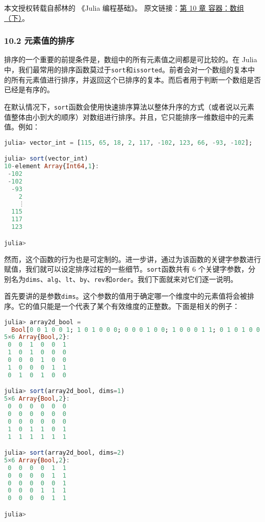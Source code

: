 
本文授权转载自郝林的 《Julia 编程基础》。 原文链接：\href{https://github.com/hyper0x/JuliaBasics/blob/master/book/ch10.md}{第 10 章 容器：数组（下）}。


\subsubsection{10.2 元素值的排序}

排序的一个重要的前提条件是，数组中的所有元素值之间都是可比较的。在 Julia 中，我们最常用的排序函数莫过于\verb`sort`和\verb`issorted`。前者会对一个数组的复本中的所有元素值进行排序，并返回这个已排序的复本。而后者用于判断一个数组是否已经是有序的。

在默认情况下，\verb`sort`函数会使用快速排序算法以整体升序的方式（或者说以元素值整体由小到大的顺序）对数组进行排序。并且，它只能排序一维数组中的元素值。例如：

\begin{lstlisting}[language=julia]
julia> vector_int = [115, 65, 18, 2, 117, -102, 123, 66, -93, -102];

julia> sort(vector_int)
10-element Array{Int64,1}:
 -102
 -102
  -93
    2
    ⋮
  115
  117
  123

julia>
\end{lstlisting}

然而，这个函数的行为也是可定制的。进一步讲，通过为该函数的关键字参数进行赋值，我们就可以设定排序过程的一些细节。\verb`sort`函数共有 6 个关键字参数，分别名为\verb`dims`、\verb`alg`、\verb`lt`、\verb`by`、\verb`rev`和\verb`order`。我们下面就来对它们逐一说明。

首先要讲的是参数\verb`dims`。这个参数的值用于确定哪一个维度中的元素值将会被排序。它的值只能是一个代表了某个有效维度的正整数。下面是相关的例子：

\begin{lstlisting}[language=julia]
julia> array2d_bool = 
  Bool[0 0 1 0 0 1; 1 0 1 0 0 0; 0 0 0 1 0 0; 1 0 0 0 1 1; 0 1 0 1 0 0]
5×6 Array{Bool,2}:
 0  0  1  0  0  1
 1  0  1  0  0  0
 0  0  0  1  0  0
 1  0  0  0  1  1
 0  1  0  1  0  0

julia> sort(array2d_bool, dims=1)
5×6 Array{Bool,2}:
 0  0  0  0  0  0
 0  0  0  0  0  0
 0  0  0  0  0  0
 1  0  1  1  0  1
 1  1  1  1  1  1

julia> sort(array2d_bool, dims=2)
5×6 Array{Bool,2}:
 0  0  0  0  1  1
 0  0  0  0  1  1
 0  0  0  0  0  1
 0  0  0  1  1  1
 0  0  0  0  1  1

julia> 
\end{lstlisting}

